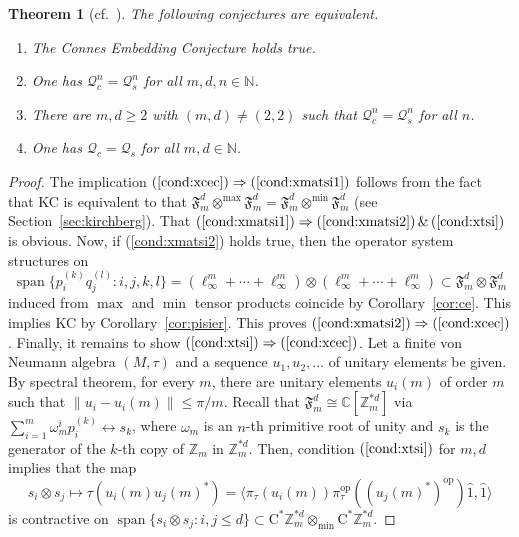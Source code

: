 \documentclass[12pt]{amsart}
\newtheorem{thm}{Theorem}
\theoremstyle{definition}
\begin{document}
\begin{thm}[cf.\ \cite{fritz,jungeetal}]
The following conjectures are equivalent.
\begin{enumerate}[$(1)$]
\item\label{cond:xcec}
The Connes Embedding Conjecture holds true.
\item\label{cond:xmatsi1}
One has ${{\mathcal Q}}_c^n={{\mathcal Q}}_s^n$ for all $m,d,n\in{{\mathbb N}}$.
\item\label{cond:xmatsi2}
There are $m,d\geq2$ with $(m,d)\neq(2,2)$ such that ${{\mathcal Q}}_c^n={{\mathcal Q}}_s^n$ for all $n$.
\item\label{cond:xtsi}
One has ${{\mathcal Q}}_c={{\mathcal Q}}_s$ for all $m,d\in{{\mathbb N}}$.
\end{enumerate}
\end{thm}
\begin{proof}
The implication $(\ref{cond:xcec})\Rightarrow(\ref{cond:xmatsi1})$
follows from the fact that KC is equivalent to
that ${{\mathfrak F}_m^d}\otimes^{\max}{{\mathfrak F}_m^d}={{\mathfrak F}_m^d}\otimes^{\min}{{\mathfrak F}_m^d}$ (see Section~\ref{sec:kirchberg}).
That $(\ref{cond:xmatsi1})\Rightarrow(\ref{cond:xmatsi2})\,\&\,(\ref{cond:xtsi})$ is obvious.
Now, if (\ref{cond:xmatsi2}) holds true, then the operator system structures on
\[
\operatorname*{span}\{p_i^{(k)}q_j^{(l)} : i,j,k,l\}
 = (\ell_\infty^m+\cdots+\ell_\infty^m)\otimes(\ell_\infty^m+\cdots+\ell_\infty^m)
 \subset {{\mathfrak F}_m^d}\otimes{{\mathfrak F}_m^d}
\]
induced from $\max$ and $\min$ tensor products coincide by Corollary~\ref{cor:ce}.
This implies KC by Corollary~\ref{cor:pisier}.
This proves $(\ref{cond:xmatsi2})\Rightarrow(\ref{cond:xcec})$.
Finally, it remains to show $(\ref{cond:xtsi})\Rightarrow(\ref{cond:xcec})$.
Let a finite von Neumann algebra $(M,\tau)$ and a sequence $u_1,u_2,\ldots$
of unitary elements be given.
By spectral theorem, for every $m$, there are unitary elements $u_i(m)$ of
order $m$ such that $\| u_i - u_i(m)\|\le\pi/m$.
Recall that ${{\mathfrak F}_m^d}\cong {{\mathbb C}}[{{\mathbb Z}}_m^{*d}]$
via $\sum_{i=1}^m \omega_m^{i}p_i^{(k)}\leftrightarrow s_k$, where
$\omega_m$ is an $n$-th primitive root of unity and $s_k$ is the generator
of the $k$-th copy of ${{\mathbb Z}}_m$ in ${{\mathbb Z}}_m^{*d}$.
Then, condition $(\ref{cond:xtsi})$ for $m,d$ implies that the map
\[
s_i\otimes s_j\mapsto \tau(u_i(m)u_j(m)^*)={\mathopen{\langle}{\pi_\tau(u_i(m))\pi_\tau^{\mathrm{op}}((u_j(m)^*)^{\mathrm{op}})\hat{1},\hat{1}}\mathclose{\rangle}}
\]
is contractive on
$\operatorname*{span}\{ s_i\otimes s_j : i,j\le d\}\subset \mathrm{C}^*{{\mathbb Z}}_m^{*d} \otimes_{\min} \mathrm{C}^*{{\mathbb Z}}_m^{*d}$.

\end{proof}
\end{document}
